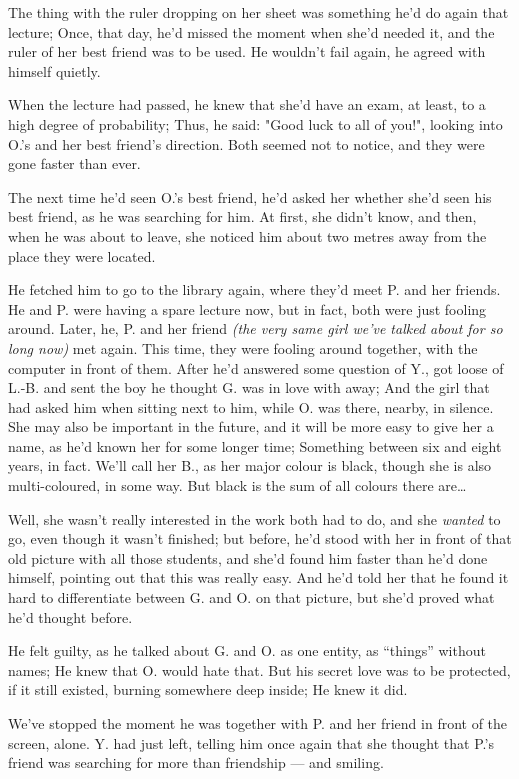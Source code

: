 The thing with the ruler dropping on her sheet was something he'd do again that lecture; Once, that day, he'd missed the moment when she'd needed it, and the ruler of her best friend was to be used. 
He wouldn't fail again, he agreed with himself quietly.

When the lecture had passed, he knew that she'd have an exam, at least, to a high degree of probability; Thus, he said: "Good luck to all of you!", looking into O.'s and her best friend's direction. 
Both seemed not to notice, and they were gone faster than ever.

The next time he'd seen O.'s best friend, he'd asked her whether she'd seen his best friend, as he was searching for him. At first, she didn't know, and then, when he was about to leave, she noticed him about two metres away from the place they were located.

He fetched him to go to the library again, where they'd meet P. and her friends. He and P. were having a spare lecture now, but in fact, both were just fooling around. 
Later, he, P. and her friend \emph{(the very same girl we've talked about for so long now)} met again. This time, they were fooling around together, with the computer in front of them. After he'd answered some question of Y., got loose of L.-B. and sent the boy he thought G. was in love with away; And the girl that had asked him when sitting next to him, while O. was there, nearby, in silence. She may also be important in the future, and it will be more easy to give her a name, as he'd known her for some longer time; Something between six and eight years, in fact. We'll call her B., as her major colour is black, though she is also multi-coloured, in some way. But black is the sum of all colours there are\ldots

Well, she wasn't really interested in the work both had to do, and she \emph{wanted} to go, even though it wasn't finished; but before, he'd stood with her in front of that old picture with all those students, and she'd found him faster than he'd done himself, pointing out that this was really easy. And he'd told her that he found it hard to differentiate between G. and O. on that picture, but she'd proved what he'd thought before.

He felt guilty, as he talked about G. and O. as one entity, as \enquote{things} without names; He knew that O. would hate that. But his secret love was to be protected, if it still existed, burning somewhere deep inside; He knew it did.

We've stopped the moment he was together with P. and her friend in front of the screen, alone. Y. had just left, telling him once again that she thought that P.'s friend was searching for more than friendship --- and smiling.

